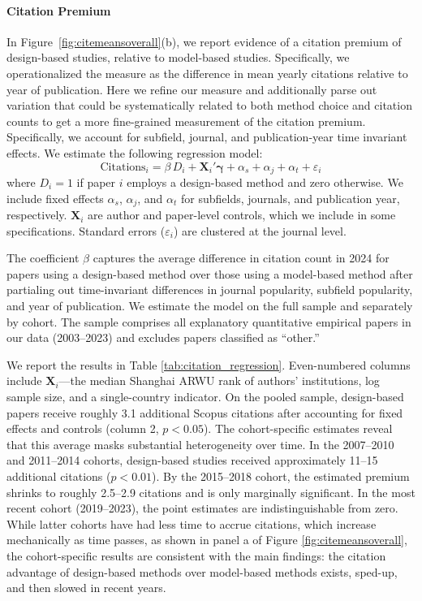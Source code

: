 \documentclass[12pt]{article}
\begin{document}
\paragraph*{Citation Premium}\label{sisec:citeprem}

In Figure~\ref{fig:citemeansoverall}(b), we report evidence of a citation premium of design-based studies, relative to model-based studies. Specifically, we operationalized the measure as the difference in mean yearly citations relative to year of publication. Here we refine our measure and additionally parse out variation that could be systematically related to both method choice and citation counts to get a more fine-grained measurement of the citation premium. Specifically, we account for subfield, journal, and publication-year time invariant effects. We estimate the following regression model:
\begin{equation}
\text{Citations}_i = \beta \, D_i + \mathbf{X}_i'\boldsymbol{\gamma} + \alpha_s + \alpha_j + \alpha_t + \varepsilon_i
\end{equation}
where $D_i = 1$ if paper $i$ employs a design-based method and zero otherwise. We include fixed effects $\alpha_s$, $\alpha_j$, and $\alpha_t$ for subfields, journals, and publication year, respectively. $\mathbf{X}_i$ are author and paper-level controls, which we include in some specifications. Standard errors ($\varepsilon_i$) are clustered at the journal level.


The coefficient $\beta$ captures the average difference in citation count in 2024 for papers using a design-based method over those using a model-based method after partialing out time-invariant differences in journal popularity, subfield popularity, and year of publication. We estimate the model on the full sample and separately by cohort. The sample comprises all explanatory quantitative empirical papers in our data (2003--2023) and excludes papers classified as ``other.''

We report the results in Table \ref{tab:citation_regression}. Even-numbered columns include  $\mathbf{X}_i$---the median Shanghai ARWU rank of authors' institutions, log sample size, and a single-country indicator. On the pooled sample, design-based papers receive roughly 3.1 additional Scopus citations after accounting for fixed effects and controls (column 2, $p < 0.05$). The cohort-specific estimates reveal that this average masks substantial heterogeneity over time. In the 2007--2010 and 2011--2014 cohorts, design-based studies received approximately 11--15 additional citations ($p < 0.01$). By the 2015--2018 cohort, the estimated premium shrinks to roughly 2.5--2.9 citations and is only marginally significant. In the most recent cohort (2019--2023), the point estimates are indistinguishable from zero. While latter cohorts have had less time to accrue citations, which increase mechanically as time passes, as shown in panel a of Figure \ref{fig:citemeansoverall}, the cohort-specific results are consistent with the main findings: the citation advantage of design-based methods over model-based methods exists, sped-up, and then slowed in recent years.
\end{document}
